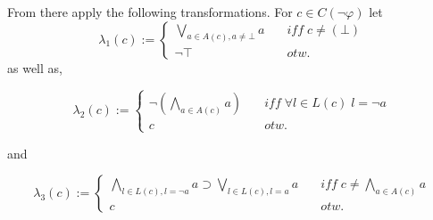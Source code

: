 \documentclass[11pt,a4paper]{article}
\begin{document}
%

From there apply the following transformations. For $c \in C(\neg \varphi)$ let 
\begin{equation*}
\lambda_1(c):=
\begin{cases}
\bigvee_{a \in  A(c), a \neq \bot}  a  &\quad \mathit{iff}\; c \neq (\bot)\\
\neg \top &\quad otw.
\end{cases}
\end{equation*}
as well as,

\begin{equation*}
\lambda_2(c):=
\begin{cases}
\neg (\bigwedge_{a \in  A(c)}  a) &\quad \mathit{iff}\; \forall l \in L(c) \; l=\neg a\\
c &\quad otw.
\end{cases}
\end{equation*}

and 


\begin{equation*}
\lambda_3(c):=
\begin{cases}
\bigwedge_{l \in  L(c), l=\neg a}  a \supset \bigvee_{l \in  L(c), l= a} a &\quad \mathit{iff}\; c \neq \bigwedge_{a \in  A(c)} a\\
c &\quad otw.
\end{cases}
\end{equation*}
\end{document}

